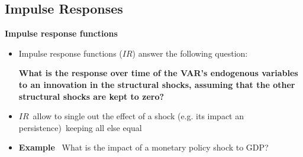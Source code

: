 \documentclass[10pt,english,t,aspectratio=169,ignorenonframetext]{beamer}
\begin{document}

\subsection{Impulse Responses}

\begin{frame}
\vspace{3cm} \color{title}\bigskip

\color{note}
\end{frame}


\begin{frame}
{\textbf{Impulse response functions}}\bigskip \bigskip

\begin{itemize}
\item Impulse response functions ($IR$) answer the following
question:\bigskip

\textbf{What is the response over time of the VAR's endogenous variables to
an innovation in the structural shocks, assuming that the other structural
shocks are kept to zero?}\bigskip \medskip \pause

\item $IR$\ allow to single out the effect of a shock (e.g. its impact an
persistence)\ keeping all else equal\bigskip \medskip

\item \textbf{Example} \ What is the impact of a monetary policy shock to
GDP?
\end{itemize}
\end{frame}

\end{document}
